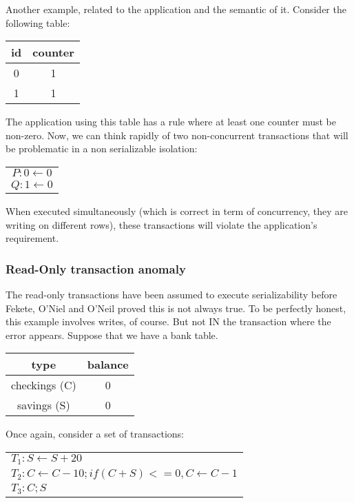 Another example, related to the application and the semantic of it. Consider the following table:

\begin{table}[H]
  \centering
  \begin{tabular}{ c | c }
    id & counter \\
        \hline
    0 & 1 \\
    1 & 1 \\
  \end{tabular}
\end{table}

The application using this table has a rule where at least one counter must be non-zero. Now, we can think rapidly of two non-concurrent transactions that will be problematic in a non serializable isolation:

\begin{table}[H]
  \centering
  \begin{tabular}{ c }
    $P:   0 \gets 0$\\
    $Q:   1 \gets 0$\\
  \end{tabular}
\end{table}

When executed simultaneously (which is correct in term of concurrency, they are writing on different rows), these transactions will violate the application's requirement.

\subsubsection{Read-Only transaction anomaly}


The read-only transactions have been assumed to execute serializability before Fekete, O'Niel and O'Neil proved this is not always true\cite{DBLP:journals/sigmod/FeketeOO04}.
To be perfectly honest, this example involves writes, of course. But not IN the transaction where the error appears. Suppose that we have a bank table.

\begin{table}[H]
  \centering
  \begin{tabular}{ c | c }
    type & balance \\
    \hline
    checkings (C) & 0 \\
    savings (S) & 0 \\
  \end{tabular}
\end{table}

Once again, consider a set of transactions:
\begin{table}[H]
  \centering
  \begin{tabular}{ l }
    $T_1:   S \gets S + 20 $\\
    $T_2:   C \gets C -10 ; if (C+S) <= 0, C \gets C -1 $\\
    $T_3:   C ; S$\\
  \end{tabular}
\end{table}

